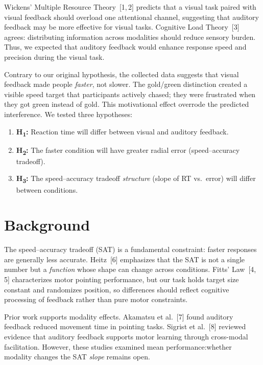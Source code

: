 \documentclass[12pt,letterpaper]{article}
\begin{document}
Wickens' Multiple Resource Theory~[1,\,2] predicts that a visual task paired with visual feedback should overload one attentional channel, suggesting that auditory feedback may be more effective for visual tasks. Cognitive Load Theory~[3] agrees: distributing information across modalities should reduce sensory burden. Thus, we expected that auditory feedback would enhance response speed and precision during the visual task.

Contrary to our original hypothesis, the collected data suggests that visual feedback made people \emph{faster}, not slower. The gold/green distinction created a visible speed target that participants actively chased; they were frustrated when they got green instead of gold. This motivational effect overrode the predicted interference. We tested three hypotheses:

\begin{enumerate}
  \item \textbf{H\textsubscript{1}:} Reaction time will differ between visual and auditory feedback.
  \item \textbf{H\textsubscript{2}:} The faster condition will have greater radial error (speed--accuracy tradeoff).
  \item \textbf{H\textsubscript{3}:} The speed--accuracy tradeoff \emph{structure} (slope of RT vs.\ error) will differ between conditions.
\end{enumerate}


\section{Background}

The speed--accuracy tradeoff (SAT) is a fundamental constraint: faster responses are generally less accurate. Heitz~[6] emphasizes that the SAT is not a single number but a \emph{function} whose shape can change across conditions. Fitts' Law~[4,\,5] characterizes motor pointing performance, but our task holds target size constant and randomizes position, so differences should reflect cognitive processing of feedback rather than pure motor constraints.

Prior work supports modality effects. Akamatsu et al.~[7] found auditory feedback reduced movement time in pointing tasks. Sigrist et al.~[8] reviewed evidence that auditory feedback supports motor learning through cross-modal facilitation. However, these studies examined mean performance:whether modality changes the SAT \emph{slope} remains open.
\end{document}
